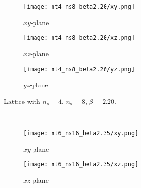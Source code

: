 \begin{figure}[!htbp]
    \centering
    \begin{subfigure}[t]{\textwidth}
        \centering
        \begin{subfigure}[t]{0.32\textwidth}
            \renewcommand\thesubfigure{\alph{subfigure}.1}
            \texttt{[image: nt4\_ns8\_beta2.20/xy.png]}
            \caption{$xy$-plane}
            \label{4F:PotentialPlanes48xy}
        \end{subfigure}
        \hfill
        \begin{subfigure}[t]{0.32\textwidth}
            \addtocounter{subfigure}{-1}
            \renewcommand\thesubfigure{\alph{subfigure}.2}
            \texttt{[image: nt4\_ns8\_beta2.20/xz.png]}
            \caption{$xz$-plane}
            \label{4F:PotentialPlanes48xz}
        \end{subfigure}
        \hfill
        \begin{subfigure}[t]{0.32\textwidth}
            \addtocounter{subfigure}{-1}
            \renewcommand\thesubfigure{\alph{subfigure}.3}
            \texttt{[image: nt4\_ns8\_beta2.20/yz.png]}
            \caption{$yz$-plane}
            \label{4F:PotentialPlanes48yz}
        \end{subfigure}
        \addtocounter{subfigure}{-1}
        \caption{Lattice with $n_s=4$, $n_s=8$, $\beta=2.20$.}
        \label{4F:PotentialPlanes48}
    \end{subfigure}\\
    \vspace{\baselineskip}
    \begin{subfigure}[b]{\textwidth}
        \centering
        \begin{subfigure}[b]{0.32\textwidth}
            \renewcommand\thesubfigure{\alph{subfigure}.1}
            \texttt{[image: nt6\_ns16\_beta2.35/xy.png]}
            \caption{$xy$-plane}
            \label{4F:PotentialPlanes616xy}
        \end{subfigure}
        \hfill
        \begin{subfigure}[b]{0.32\textwidth}
            \addtocounter{subfigure}{-1}
            \renewcommand\thesubfigure{\alph{subfigure}.2}
            \texttt{[image: nt6\_ns16\_beta2.35/xz.png]}
            \caption{$xz$-plane}
            \label{4F:PotentialPlanes616xz}
        \end{subfigure}
        \hfill
        \begin{subfigure}[b]{0.32\textwidth}

\end{subfigure}
\end{subfigure}
\end{figure}
